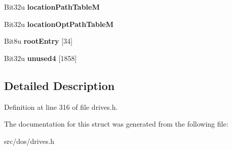 \begin{DoxyCompactItemize}
\item 
\hypertarget{structisoPVD_ac7c7394e29ebb216df4029953ab6b337}{Bit32u {\bfseries location\-Path\-Table\-M}}\label{structisoPVD_ac7c7394e29ebb216df4029953ab6b337}

\item 
\hypertarget{structisoPVD_a69bb36d8476c0029f6a33b38d1fceb21}{Bit32u {\bfseries location\-Opt\-Path\-Table\-M}}\label{structisoPVD_a69bb36d8476c0029f6a33b38d1fceb21}

\item 
\hypertarget{structisoPVD_ac597b7476c7b1e6573c8ea621c423df8}{Bit8u {\bfseries root\-Entry} \mbox{[}34\mbox{]}}\label{structisoPVD_ac597b7476c7b1e6573c8ea621c423df8}

\item 
\hypertarget{structisoPVD_a78b65797080943af3276b8f142544450}{Bit32u {\bfseries unused4} \mbox{[}1858\mbox{]}}\label{structisoPVD_a78b65797080943af3276b8f142544450}

\end{DoxyCompactItemize}


\subsection{Detailed Description}


Definition at line 316 of file drives.\-h.



The documentation for this struct was generated from the following file\-:\begin{DoxyCompactItemize}
\item 
src/dos/drives.\-h\end{DoxyCompactItemize}
